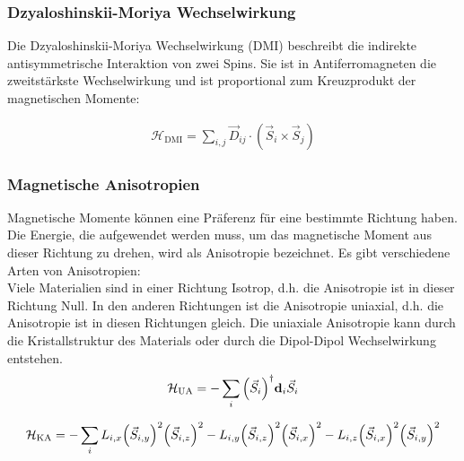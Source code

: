 \documentclass[main.tex]{subfiles}
\begin{document}
\subsubsection*{Dzyaloshinskii-Moriya Wechselwirkung}

Die Dzyaloshinskii-Moriya Wechselwirkung (DMI) beschreibt die indirekte
antisymmetrische Interaktion von zwei Spins\cite{DMI}. Sie ist in
Antiferromagneten die zweitstärkste Wechselwirkung und ist proportional zum
Kreuzprodukt der magnetischen Momente:

\begin{align}
	\mathcal{H}_{\text{DMI}} = \sum_{i,j} \vec{D}_{ij} \cdot (\vec{S}_i
	\times
	\vec{S}_j)
\end{align}

\subsubsection*{Magnetische Anisotropien}
Magnetische Momente können eine Präferenz für eine bestimmte Richtung haben.
Die Energie, die aufgewendet werden muss, um das magnetische Moment aus dieser
Richtung zu drehen, wird als Anisotropie bezeichnet. Es gibt verschiedene Arten
von Anisotropien:\\

Viele Materialien sind in einer Richtung Isotrop, d.h. die Anisotropie ist in
dieser Richtung Null. In den anderen Richtungen ist die Anisotropie uniaxial,
d.h. die Anisotropie ist in diesen Richtungen gleich. Die uniaxiale Anisotropie
kann durch die Kristallstruktur des Materials oder durch die Dipol-Dipol
Wechselwirkung entstehen.\\

\begin{align}
	\mathcal{H}_{\text{UA}} = -\sum_{i} \qty(\vec{S}_i)^\dagger
	\mathbf{d}_i
	\vec{S}_i
\end{align}

\begin{align}
	\mathcal{H}_{\text{KA}} = -\sum_{i} L_{i,x} \qty(\vec{S}_{i,y})^2
	\qty(\vec{S}_{i,z})^2 - L_{i,y} \qty(\vec{S}_{i,z})^2
	\qty(\vec{S}_{i,x})^2
	-
	L_{i,z} \qty(\vec{S}_{i,x})^2 \qty(\vec{S}_{i,y})^2
\end{align}\cite{GrossMarx}
\end{document}
